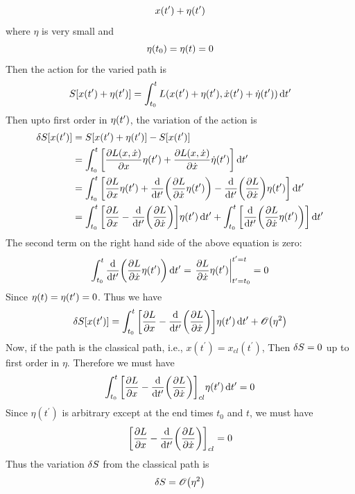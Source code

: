 		\begin{equation}
			x\qty(t^\prime) + \eta\qty(t^\prime)
		\end{equation}
		where $\eta$ is very small and 
		\begin{equation}
			\eta\qty(t_0) = \eta\qty(t) = 0
		\end{equation}
		Then the action for the varied path is 
		\begin{equation}
			S\qty[x(t^\prime) + \eta\qty(t^\prime)] = \int_{t_0}^{t} L\qty(x\qty(t^\prime) + \eta\qty(t^\prime), \dot{x}\qty(t^\prime) + \dot{\eta}\qty(t^\prime)) \dd{t^\prime}
		\end{equation}
		Then upto first order in $\eta\qty(t^\prime)$, the variation of the action is
		\begin{align*}
			\var{S\qty[x\qty(t^\prime)]} 
			&= S\qty[x\qty(t^\prime) + \eta\qty(t^\prime)] - S\qty[x\qty(t^\prime)] \\
			&= \int_{t_0}^{t} \qty[\pdv{L\qty(x, \dot{x})}{x} \eta\qty(t^\prime)  + \pdv{L\qty(x, \dot{x})}{\dot{x}} \dot{\eta}\qty(t^\prime)] \dd{t^\prime} \\
			&= \int_{t_0}^{t} \qty[\pdv{L}{x}\eta\qty(t^\prime) + \dv{t^\prime}\qty(\pdv{L}{\dot{x}} \eta\qty(t^\prime))  - \dv{t^\prime}\qty(\pdv{L}{\dot{x}}) \eta\qty(t^\prime)] \dd{t^\prime} \\
			&= \int_{t_0}^{t} \qty[\pdv{L}{x}  -
			 \dv{t^\prime}\qty(\pdv{L}{\dot{x}})] \eta\qty(t^\prime) \dd{t^\prime}
			 + \int_{t_0}^{t} \qty[
			 \dv{t^\prime}\qty(\pdv{L}{\dot{x}} \eta\qty(t^\prime))] \dd{t^\prime}
		\end{align*}
		The second term on the right hand side of the above equation is zero:
		\begin{equation}
			\int_{t_0}^{t} \dv{t^\prime}\qty(\pdv{L}{\dot{x}} \eta\qty(t^\prime)) \dd{t^\prime} = \eval{\pdv{L}{\dot{x}}\eta\qty(t^\prime)}_{t^\prime=t_0}^{t^\prime=t} = 0
		\end{equation}
		Since $\eta\qty(t) = \eta\qty(t^\prime) =0$. Thus we have
		\begin{equation}
			\var{S\qty[x\qty(t^\prime)]}  = \int_{t_0}^{t} \qty[\pdv{L}{x}  -
			\dv{t^\prime}\qty(\pdv{L}{\dot{x}})] \eta\qty(t^\prime) \dd{t^\prime} + \order{\eta^2}
		\end{equation}
		Now, if the path is the classical path, i.e., $x(t^\prime) = x_{cl}(t^\prime)$, Then $\var{S} = 0$ up to first order in $\eta$. Therefore we must have
		\begin{equation}
			\int_{t_0}^{t} \qty[\pdv{L}{x}  -
			\dv{t^\prime}\qty(\pdv{L}{\dot{x}})]_{cl} \eta\qty(t^\prime) \dd{t^\prime} = 0
		\end{equation}
		Since $\eta(t^\prime)$ is arbitrary except at the end times $t_0$ and $t$, we must have
		\begin{equation}
			\qty[\pdv{L}{x}  -
			\dv{t^\prime}\qty(\pdv{L}{\dot{x}})]_{cl} = 0
		\end{equation}
		Thus the variation $\var{S}$ from the classical path is 
		\begin{equation}
			\var{S} = \order{\eta^2}
		\end{equation}
		
